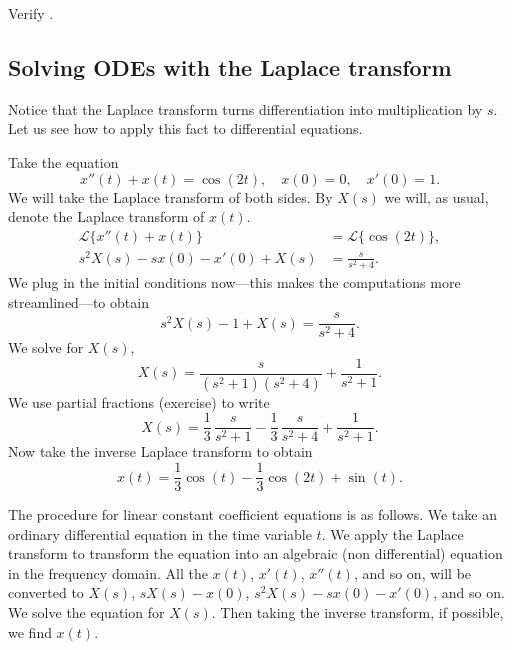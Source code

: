 \documentclass[12pt]{book}
\begin{document}
\begin{exercise}
Verify .
\end{exercise}

\subsection{Solving ODEs with the Laplace transform}

Notice that the Laplace transform turns differentiation into
multiplication by $s$.  Let us see how to apply this fact to differential
equations.

\begin{example}
Take the equation
\begin{equation*}
x''(t) + x(t) = \cos (2t), \quad x(0) = 0, \quad x'(0) = 1 .
\end{equation*}
We will take the Laplace transform of both sides.
By $X(s)$ we will, as usual, denote the Laplace transform of
$x(t)$.
\begin{align*}
\mathcal{L} \{ x''(t) + x(t) \} & = \mathcal{L} \{ \cos (2t) \} , \\
s^2 X(s) -sx(0)-x'(0) + X(s) & = \frac{s}{s^2 + 4} .
\end{align*}
We plug in the initial conditions now---this makes the computations more
streamlined---to obtain
\begin{equation*}
s^2 X(s) -1 + X(s) = \frac{s}{s^2 + 4} .
\end{equation*}
We solve for $X(s)$,
\begin{equation*}
X(s) = \frac{s}{(s^2+1)(s^2 + 4)} + \frac{1}{s^2+1} .
\end{equation*}
We use partial fractions (exercise) to write
\begin{equation*}
X(s) =\frac{1}{3} \, \frac{s}{s^2+1} - 
\frac{1}{3}\, \frac{s}{s^2+4} + \frac{1}{s^2+1} .
\end{equation*}
Now take the inverse Laplace transform to obtain
\begin{equation*}
x(t) =\frac{1}{3}  \cos (t) -
\frac{1}{3} \cos (2t) + \sin (t) .
\end{equation*}
\end{example}

The procedure for linear constant coefficient equations is as follows.
We take an ordinary differential
equation in the time variable $t$.  We apply the Laplace transform
to transform the equation into an algebraic (non differential) equation in
the frequency domain.  All the $x(t)$, $x'(t)$, $x''(t)$, and so on, will
be converted to $X(s)$, $sX(s) - x(0)$, $s^2X(s) - sx(0) - x'(0)$,
and so on.
We solve the equation for $X(s)$.
Then taking the inverse transform, if possible, we find $x(t)$.
\end{document}
